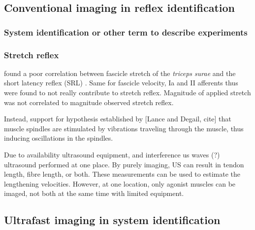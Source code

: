 \subsection{Conventional imaging in reflex identification}


\subsubsection{System identification or other term to describe experiments}


\subsubsection{Stretch reflex}
\citeauthor{cronin_triceps_2015} found a poor correlation between fascicle stretch of the \textit{triceps surae} and the short latency reflex (SRL) \cite{cronin_triceps_2015}. Same for fascicle velocity, Ia and II afferents thus were found to not really contribute to stretch reflex. Magnitude of applied stretch was not correlated to magnitude observed stretch reflex. 

Instead, support for hypothesis established by [Lance and Degail, cite] that muscle spindles are stimulated by vibrations traveling through the muscle, thus inducing oscillations in the spindles. 





Due to availability ultrasound equipment, and interference us waves (?) ultrasound performed at one place. By purely imaging, US can result in tendon length, fibre length, or both. These measurements can be used to estimate the lengthening velocities. 
However, at one location, only agonist muscles can be imaged, not both at the same time with limited equipment.  



\subsection{Ultrafast imaging in system identification}






